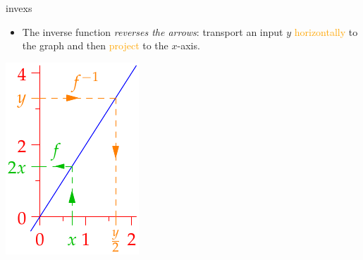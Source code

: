 \begin{examples}{}{invexs}
\begin{enumerate}
\begin{minipage}[t]{0.79\linewidth}
\begin{itemize}
	  \item The inverse function \emph{reverses the arrows}: transport an input $y$ \textcolor{orange}{horizontally} to the graph and then \textcolor{orange}{project} to the $x$-axis.
	\end{itemize}
\end{minipage}\hfill\begin{minipage}[t]{0.2\linewidth}\vspace{-25pt}
\flushright\includegraphics{inverses-line}
\end{minipage}\smallbreak


\end{enumerate}
\end{examples}
